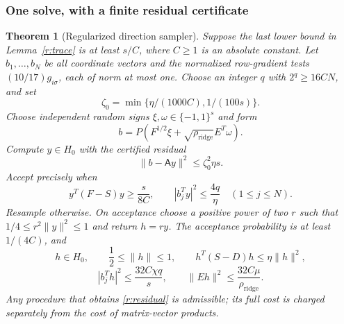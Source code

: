\documentclass[11pt]{amsart}
\newtheorem{theorem}{Theorem}[section]
\theoremstyle{definition}\newtheorem{definition}[theorem]{Definition}
\theoremstyle{remark}\newtheorem{remark}[theorem]{Remark}
\numberwithin{equation}{section}
\begin{document}
\subsubsection{One solve, with a finite residual certificate}
\begin{theorem}[Regularized direction sampler]\label{r:sampler}
Suppose the last lower bound in Lemma~\ref{r:trace} is at least $s/C$,
where $C\ge1$ is an absolute constant. Let $b_1,\ldots,b_N$ be all coordinate vectors and the normalized
row-gradient tests $(10/17)g_{i\sigma}$, each of norm at most one. Choose an integer $q$ with $2^q\ge16CN$, and set
\[
 \zeta_0=\min\{\eta/(1000C),1/(100s)\}.
\]
Choose independent random signs $\xi,\omega\in\{-1,1\}^s$ and form
\[
 b=P(F^{1/2}\xi+\sqrt{\rho_{\mathrm{ridge}}} E^T\omega).
\]
Compute $y\in H_0$ with the certified residual
\begin{equation}\label{r:residual}
 \|b-\mathsf{A}y\|^2\le\zeta_0^2\eta s.
\end{equation}
Accept precisely when
\begin{equation}\label{r:accept}
 y^T(F-S)y\ge\frac{s}{8C},\qquad
 |b_j^Ty|^2\le\frac{4q}{\eta}\quad(1\le j\le N).
\end{equation}
Resample otherwise. On acceptance choose a positive power of two $r$ such that
$1/4\le r^2\|y\|^2\le1$ and return $h=ry$.
The acceptance probability is at least $1/(4C)$, and
\[
 h\in H_0,\qquad \frac12\le\|h\|\le1,\qquad
 h^T(S-D)h\le\eta\|h\|^2,
\]
\begin{equation}\label{r:flat}
 |b_j^Th|^2\le\frac{32C\chi q}{s},\qquad
 \|Eh\|^2\le\frac{32C\mu}{\rho_{\mathrm{ridge}}}.
\end{equation}
Any procedure that obtains \eqref{r:residual} is admissible; its full cost
is charged separately from the cost of matrix-vector products.
\end{theorem}
\end{document}
